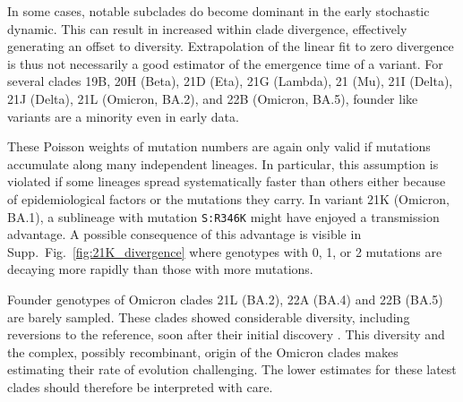 \documentclass[aps,rmp, twocolumn]{revtex4}
\begin{document}
In some cases, notable subclades do become dominant in the early stochastic dynamic.
This can result in increased within clade divergence, effectively generating an offset to diversity.
Extrapolation of the linear fit to zero divergence is thus not necessarily a good estimator of the emergence time of a variant.
For several clades 19B, 20H (Beta), 21D (Eta), 21G (Lambda), 21 (Mu), 21I (Delta), 21J (Delta), 21L (Omicron, BA.2), and 22B (Omicron, BA.5), founder like variants are a minority even in early data.

These Poisson weights of mutation numbers are again only valid if mutations accumulate along many independent lineages.
In particular, this assumption is violated if some lineages spread systematically faster than others either because of epidemiological factors or the mutations they carry.
In variant 21K (Omicron, BA.1), a sublineage with mutation \texttt{S:R346K} might have enjoyed a transmission advantage.
A possible consequence of this advantage is visible in Supp.~Fig.~\ref{fig:21K_divergence} where genotypes with 0, 1, or 2 mutations are decaying more rapidly than those with more mutations.

Founder genotypes of Omicron clades 21L (BA.2), 22A (BA.4) and 22B (BA.5) are barely sampled.
These clades showed considerable diversity, including reversions to the reference, soon after their initial discovery \citep{tegally_emergence_2022}.
This diversity and the complex, possibly recombinant, origin of the Omicron clades makes estimating their rate of evolution challenging.
The lower estimates for these latest clades should therefore be interpreted with care.
\end{document}
